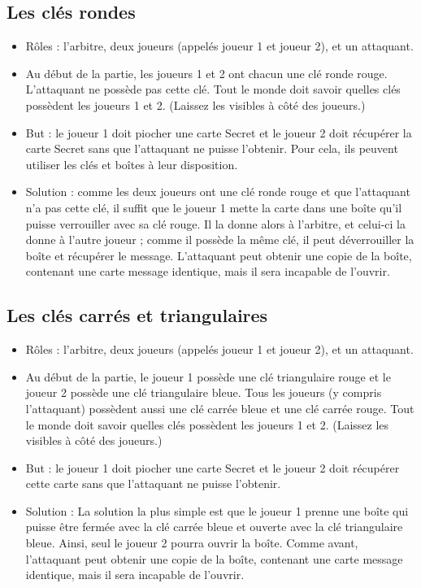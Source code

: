 \documentclass[a4paper,10pt]{article}
\begin{document}
\subsection{Les clés rondes}
\begin{itemize}
	\item Rôles : l'arbitre, deux joueurs (appelés joueur 1 et joueur 2), et un attaquant.
	\item Au début de la partie, les joueurs 1 et 2 ont chacun une clé ronde rouge. L'attaquant ne possède pas cette clé. Tout le monde doit savoir quelles clés possèdent les joueurs 1 et 2. (Laissez les visibles à côté des joueurs.)
	\item But : le joueur 1 doit piocher une carte Secret et le joueur 2 doit récupérer la carte Secret sans que l'attaquant ne puisse l'obtenir. Pour cela, ils peuvent utiliser les clés et boîtes à leur disposition.
	\item Solution : comme les deux joueurs ont une clé ronde rouge et que l'attaquant n'a pas cette clé, il suffit que le joueur 1 mette la carte dans une boîte qu'il puisse verrouiller avec sa clé rouge. Il la donne alors à l'arbitre, et celui-ci la donne à l'autre joueur ; comme il possède la même clé, il peut déverrouiller la boîte et récupérer le message. L'attaquant peut obtenir une copie de la boîte, contenant une carte message identique, mais il sera incapable de l'ouvrir.
\end{itemize}

\subsection{Les clés carrés et triangulaires}
\begin{itemize}
	\item Rôles : l'arbitre, deux joueurs (appelés joueur 1 et joueur 2), et un attaquant.
	\item Au début de la partie, le joueur 1 possède une clé triangulaire rouge et le joueur 2 possède une clé triangulaire bleue. Tous les joueurs (y compris l'attaquant) possèdent aussi une clé carrée bleue et une clé carrée rouge. Tout le monde doit savoir quelles clés possèdent les joueurs 1 et 2. (Laissez les visibles à côté des joueurs.)
	\item But : le joueur 1 doit piocher une carte Secret et le joueur 2 doit récupérer cette carte sans que l'attaquant ne puisse l'obtenir.
	\item Solution : La solution la plus simple est que le joueur 1 prenne une boîte qui puisse être fermée avec la clé carrée bleue et ouverte avec la clé triangulaire bleue. Ainsi, seul le joueur 2 pourra ouvrir la boîte. Comme avant, l'attaquant peut obtenir une copie de la boîte, contenant une carte message identique, mais il sera incapable de l'ouvrir.
\end{itemize}
\end{document}
